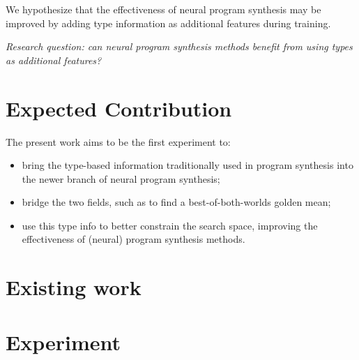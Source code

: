 \documentclass{article}
\begin{document}
We hypothesize that the effectiveness of neural program synthesis may be improved by 
adding type information as additional features during training.



\emph{Research question: can neural program synthesis methods benefit from using types as additional features?}

\section{Expected Contribution}

The present work aims to be the first experiment to:
\begin{itemize}
    \item bring the type-based information traditionally used in program synthesis into the newer branch of neural program synthesis;
    \item bridge the two fields, such as to find a best-of-both-worlds golden mean;
    \item use this type info to better constrain the search space, improving the effectiveness of (neural) program synthesis methods. 
\end{itemize}

\section{Existing work}



\section{Experiment}
\end{document}
